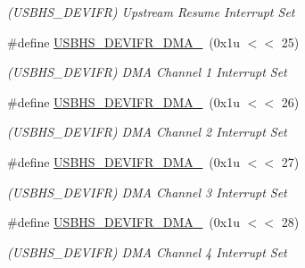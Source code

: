 \begin{DoxyCompactItemize}
\begin{DoxyCompactList}\small\item\em (U\+S\+B\+H\+S\+\_\+\+D\+E\+V\+I\+FR) Upstream Resume Interrupt Set \end{DoxyCompactList}\item 
\mbox{\label{group__SAME70__USBHS_gab5569c75eca3a6b0948f66efeb6d4106}} 
\#define \mbox{\hyperlink{group__SAME70__USBHS_gab5569c75eca3a6b0948f66efeb6d4106}{U\+S\+B\+H\+S\+\_\+\+D\+E\+V\+I\+F\+R\+\_\+\+D\+M\+A\+\_}}~(0x1u $<$$<$ 25)
\begin{DoxyCompactList}\small\item\em (U\+S\+B\+H\+S\+\_\+\+D\+E\+V\+I\+FR) D\+MA Channel 1 Interrupt Set \end{DoxyCompactList}\item 
\mbox{\label{group__SAME70__USBHS_ga0f827b97dbe7dff7d554b7f37e6aa813}} 
\#define \mbox{\hyperlink{group__SAME70__USBHS_ga0f827b97dbe7dff7d554b7f37e6aa813}{U\+S\+B\+H\+S\+\_\+\+D\+E\+V\+I\+F\+R\+\_\+\+D\+M\+A\+\_}}~(0x1u $<$$<$ 26)
\begin{DoxyCompactList}\small\item\em (U\+S\+B\+H\+S\+\_\+\+D\+E\+V\+I\+FR) D\+MA Channel 2 Interrupt Set \end{DoxyCompactList}\item 
\mbox{\label{group__SAME70__USBHS_gaf66bef1e7538546cab2e2801601f3c08}} 
\#define \mbox{\hyperlink{group__SAME70__USBHS_gaf66bef1e7538546cab2e2801601f3c08}{U\+S\+B\+H\+S\+\_\+\+D\+E\+V\+I\+F\+R\+\_\+\+D\+M\+A\+\_}}~(0x1u $<$$<$ 27)
\begin{DoxyCompactList}\small\item\em (U\+S\+B\+H\+S\+\_\+\+D\+E\+V\+I\+FR) D\+MA Channel 3 Interrupt Set \end{DoxyCompactList}\item 
\mbox{\label{group__SAME70__USBHS_ga3c95cdd8ee93ef8dfc817fd28088e474}} 
\#define \mbox{\hyperlink{group__SAME70__USBHS_ga3c95cdd8ee93ef8dfc817fd28088e474}{U\+S\+B\+H\+S\+\_\+\+D\+E\+V\+I\+F\+R\+\_\+\+D\+M\+A\+\_}}~(0x1u $<$$<$ 28)
\begin{DoxyCompactList}\small\item\em (U\+S\+B\+H\+S\+\_\+\+D\+E\+V\+I\+FR) D\+MA Channel 4 Interrupt Set \end{DoxyCompactList}\item 

\end{DoxyCompactItemize}
